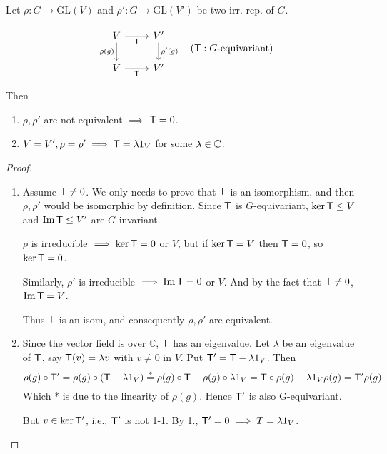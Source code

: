 \begin{lemma}
  Let $\rho: G \to \text{GL}(V)$ and $\rho': G\to \text{GL}(V')$ be two irr.
  rep. of $G$.
  
  \[
    \begin{tikzcd}
      V \arrow[d, "\rho(g)"'] \arrow[r, "{\sf T}"'] & V' \arrow[d, "\rho'(g)"] \\
      V \arrow[r, "{\sf T}"'] & V'
    \end{tikzcd}
    \quad ({\sf T}: G\text{-equivariant})
  \]

  Then
  \begin{enumerate}
    \item $\rho, \rho'$ are not equivalent $\implies$ ${\sf T} = 0$.
    \item $V = V', \rho = \rho' \implies {\sf T} = \lambda 1_V$ for some
      $\lambda \in \mathbb{C}$.
  \end{enumerate}

  \begin{proof} \mbox{}
    \begin{enumerate}
      \item Assume ${\sf T} \ne 0$. We only needs to prove that ${\sf T}$ is an isomorphism,
        and then $\rho, \rho'$ would be isomorphic by definition.
        Since ${\sf T}$ is $G$-equivariant,
        $\ker {\sf T} \le V$ and $\operatorname{Im} {\sf T}\le V'$ are $G$-invariant.

        $\rho$ is irreducible $\implies \ker {\sf T} = 0$ or $V$, but 
        if $\ker {\sf T} = V$ then ${\sf T} = 0$, so $\ker {\sf T} = 0$.

        Similarly, $\rho'$ is irreducible $\implies \operatorname{Im} {\sf T} = 0$ or $V$. 
        And by the fact that ${\sf T} \neq 0$, $\operatorname{Im} {\sf T} = V$.

        Thus ${\sf T}$ is an isom, and consequently $\rho, \rho'$ are equivalent.

      \item  Since the vector field is over $\mathbb{C}$, ${\sf T}$ has 
        an eigenvalue. Let $\lambda$ be an eigenvalue of ${\sf T}$, say
        ${\sf T}(v) = \lambda v$ with $v \ne 0$ in $V$.
        Put ${\sf T}' = {\sf T} - \lambda 1_V$. Then
        \[ \rho(g) \circ {\sf T}' = \rho(g) \circ ({\sf T} - \lambda 1_V) \stackrel{*}{=}
          \rho(g) \circ {\sf T} - \rho(g) \circ \lambda 1_V =
          {\sf T} \circ \rho(g) - \lambda 1_V \rho(g) = {\sf T}' \rho(g) \]
        Which * is due to the linearity of $\rho(g)$. Hence ${\sf T}'$ is
        also G-equivariant.

        But $v \in \ker {\sf T}'$, i.e., ${\sf T}'$ is not 1-1. By 1., ${\sf T'} = 0 \implies
        T = \lambda 1_V$.
    \end{enumerate}
  \end{proof}
\end{lemma}

